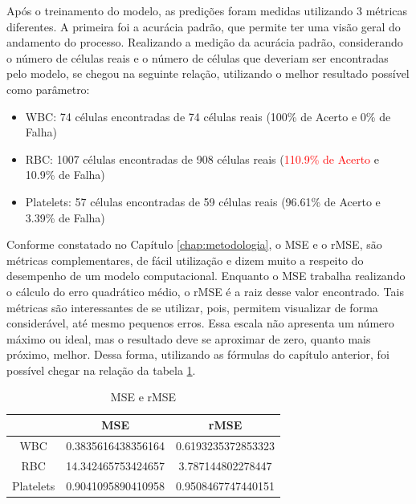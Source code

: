 Após o treinamento do modelo, as predições foram medidas utilizando 3 métricas diferentes. A primeira foi a acurácia padrão, que permite ter uma visão geral do andamento do processo. Realizando a medição da acurácia padrão, considerando o número de células reais e o número de células que deveriam ser encontradas pelo modelo, se chegou na seguinte relação, utilizando o melhor resultado possível como parâmetro:

\begin{itemize}
    \item WBC: 74 células encontradas de 74 células reais (100\% de Acerto e 0\% de Falha)
    \item RBC: 1007 células encontradas de 908 células reais (\textcolor{red}{110.9\% de Acerto} e 10.9\% de Falha)
    \item Platelets: 57 células encontradas de 59 células reais (96.61\% de Acerto e 3.39\% de Falha)
\end{itemize}

Conforme constatado no Capítulo \ref{chap:metodologia}, o MSE e o rMSE, são métricas complementares, de fácil utilização e dizem muito a respeito do desempenho de um modelo computacional. Enquanto o MSE trabalha realizando o cálculo do erro quadrático médio, o rMSE é a raiz desse valor encontrado. Tais métricas são interessantes de se utilizar, pois, permitem visualizar de forma considerável, até mesmo pequenos erros. Essa escala não apresenta um número máximo ou ideal, mas o resultado deve se aproximar de zero, quanto mais próximo, melhor. Dessa forma, utilizando as fórmulas do capítulo anterior, foi possível chegar na relação da tabela \ref{tbl:mse}.

\begin{table}[!htb]
	\centering
	\caption{MSE e rMSE}
	\label{tbl:mse}
	\begin{tabular}{|c|c|c|}
		\hline
		          & MSE                & rMSE               \\ \hline
		WBC       & 0.3835616438356164 & 0.6193235372853323 \\ \hline
		RBC       & 14.342465753424657 & 3.787144802278447  \\ \hline
		Platelets & 0.9041095890410958 & 0.9508467747440151 \\ \hline
	\end{tabular}
	\vspace{6pt}
\end{table}

